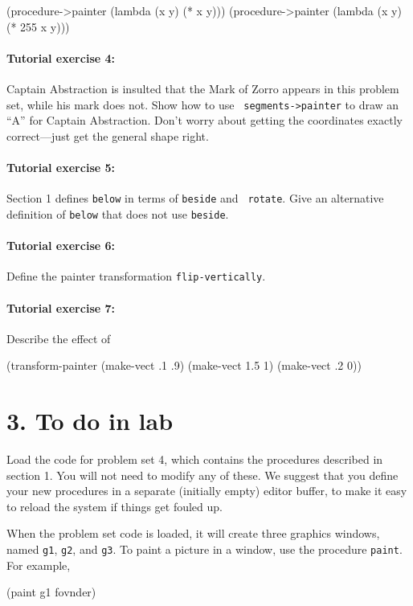 \beginlisp
(procedure->painter (lambda (x y) (* x y)))
(procedure->painter (lambda (x y) (* 255 x y)))
\endlisp

\paragraph{Tutorial exercise 4:}
Captain Abstraction is insulted that the Mark of Zorro appears in this
problem set, while his mark does not.  Show how to use {\tt
segments->painter} to draw an ``A'' for Captain Abstraction.  Don't
worry about getting the coordinates exactly correct---just get the
general shape right.

\paragraph{Tutorial exercise 5:}
Section 1 defines {\tt below} in terms of {\tt beside} and {\tt
rotate}.  Give an alternative definition of {\tt below} that does not
use {\tt beside}.

\paragraph{Tutorial exercise 6:}
Define the painter transformation {\tt flip-vertically}.

\paragraph{Tutorial exercise 7:}
Describe the effect of

\beginlisp
(transform-painter (make-vect .1 .9)
                   (make-vect 1.5 1)
                   (make-vect .2 0))
\endlisp

\section{3. To do in lab}

Load the code for problem set 4, which contains the procedures
described in section 1.  You will not need to modify any of these.  We
suggest that you define your new procedures in a separate (initially
empty) editor buffer, to make it easy to reload the system if things
get fouled up.

When the problem set code is loaded, it will create three graphics windows,
named {\tt g1}, {\tt g2}, and {\tt g3}.  To paint a picture in a
window, use the procedure {\tt paint}.  For example,

\beginlisp
(paint g1 fovnder)
\endlisp

